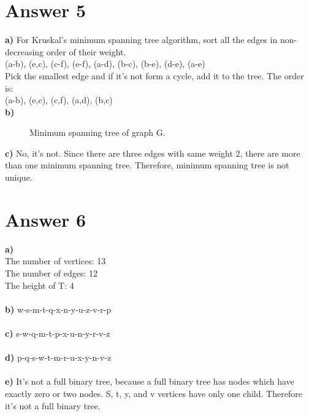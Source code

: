 \documentclass[12pt]{article}
\begin{document}
\section*{Answer 5}
\textbf{a)} For Kruskal’s minimum spanning tree algorithm, sort all the edges in non-decreasing order of their weight. \\
(a-b), (e,c), (c-f), (e-f), (a-d), (b-c), (b-e), (d-e), (a-e) \\
Pick the smallest edge and if it's not form a cycle, add it to the tree. The order is: \\
(a-b), (e,c), (c,f), (a,d), (b,c) \\
\textbf{b)} \\
    \begin{figure}[H]
    	\centering
    	\caption{Minimum spanning tree of graph G.}	
    	\label{fig:g5}
    \end{figure}
\textbf{c)} No, it's not. Since there are three edges with same weight 2, there are more than one minimum spanning tree. Therefore, minimum spanning tree is not unique.\\

\section*{Answer 6}
\textbf{a)} \\
The number of vertices: 13\\
The number of edges: 12\\
The height of T: 4\\\\
\textbf{b)} w-s-m-t-q-x-n-y-u-z-v-r-p\\\\
\textbf{c)} s-w-q-m-t-p-x-u-n-y-r-v-z\\\\
\textbf{d)} p-q-s-w-t-m-r-u-x-y-n-v-z\\\\
\textbf{e)} It's not a full binary tree, because a full binary tree has nodes which have exactly zero or two nodes. S, t, y, and v vertices have only one child. Therefore it's not a full binary tree.\\
\end{document}
